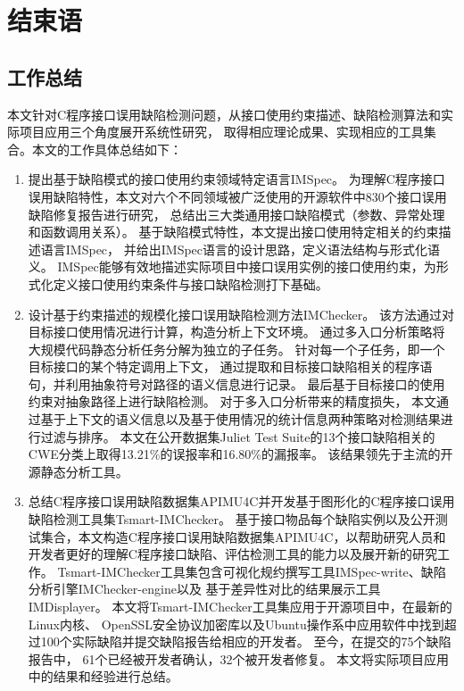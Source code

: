 \chapter{结束语}
\label{cha:con}

\section{工作总结}
本文针对C程序接口误用缺陷检测问题，从接口使用约束描述、缺陷检测算法和实际项目应用三个角度展开系统性研究，
取得相应理论成果、实现相应的工具集合。本文的工作具体总结如下：
\begin{enumerate}
	\item 提出基于缺陷模式的接口使用约束领域特定语言IMSpec。
	为理解C程序接口误用缺陷特性，本文对六个不同领域被广泛使用的开源软件中830个接口误用缺陷修复报告进行研究，
	总结出三大类通用接口缺陷模式（参数、异常处理和函数调用关系）。
	基于缺陷模式特性，本文提出接口使用特定相关的约束描述语言IMSpec，
	并给出IMSpec语言的设计思路，定义语法结构与形式化语义。
	IMSpec能够有效地描述实际项目中接口误用实例的接口使用约束，为形式化定义接口使用约束条件与接口缺陷检测打下基础。
	
	\item 设计基于约束描述的规模化接口误用缺陷检测方法IMChecker。
	该方法通过对目标接口使用情况进行计算，构造分析上下文环境。
	通过多入口分析策略将大规模代码静态分析任务分解为独立的子任务。
	针对每一个子任务，即一个目标接口的某个特定调用上下文，
	通过提取和目标接口缺陷相关的程序语句，并利用抽象符号对路径的语义信息进行记录。
	最后基于目标接口的使用约束对抽象路径上进行缺陷检测。
	对于多入口分析带来的精度损失，
	本文通过基于上下文的语义信息以及基于使用情况的统计信息两种策略对检测结果进行过滤与排序。
	本文在公开数据集Juliet Test Suite的13个接口缺陷相关的CWE分类上取得13.21\%的误报率和16.80\%的漏报率。
	该结果领先于主流的开源静态分析工具。
	
	\item 总结C程序接口误用缺陷数据集APIMU4C并开发基于图形化的C程序接口误用缺陷检测工具集Tsmart-IMChecker。
	基于接口物品每个缺陷实例以及公开测试集合，本文构造C程序接口误用缺陷数据集APIMU4C，以帮助研究人员和开发者更好的理解C程序接口缺陷、评估检测工具的能力以及展开新的研究工作。
	Tsmart-IMChecker工具集包含可视化规约撰写工具IMSpec-write、缺陷分析引擎IMChecker-engine以及
	基于差异性对比的结果展示工具IMDisplayer。
	本文将Tsmart-IMChecker工具集应用于开源项目中，在最新的Linux内核、
	OpenSSL安全协议加密库以及Ubuntu操作系中应用软件中找到超过100个实际缺陷并提交缺陷报告给相应的开发者。
	至今，在提交的75个缺陷报告中，
	61个已经被开发者确认，32个被开发者修复。
	本文将实际项目应用中的结果和经验进行总结。
	
	
\end{enumerate}


